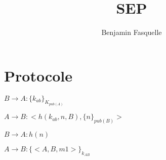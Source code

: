 \documentclass[10pt,a4paper]{article}
\author{Benjamin Fasquelle}
\title{SEP}
\begin{document}
\maketitle


\section{Protocole}

$B \rightarrow A: \{k_{ab}\}_{K_{pub(A)}}$


$A \rightarrow B: <h(k_{ab}, n, B), \{n\}_{pub(B)} > $

$B \rightarrow A: h(n)$


$A \rightarrow B: \{<A, B, m1>\}_{k_{AB}}$
\end{document}
